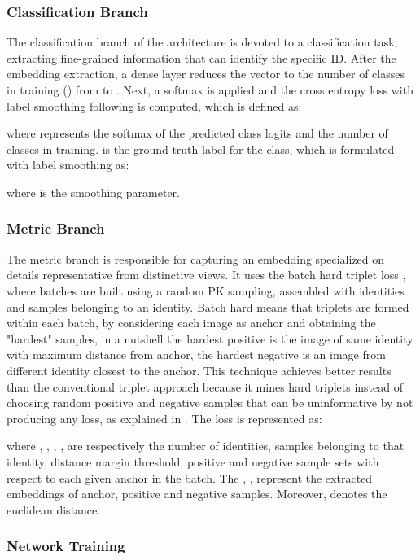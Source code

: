 \documentclass[letterpaper, 10pt, conference]{ieeeconf}
\begin{document}
\subsubsection{Classification Branch}
The classification branch of the architecture is devoted to a classification task, extracting fine-grained information that can identify the specific ID. After the embedding extraction, a dense layer reduces the vector to the number of classes in training () from  to . Next, a softmax is applied and the cross entropy loss with label smoothing following \cite{szegedy2016rethinking} is computed, which is defined as:

where  represents the softmax of the predicted class logits and  the number of classes in training.  is the ground-truth label for the  class, which is formulated with label smoothing as:

where  is the smoothing parameter.

\subsubsection{Metric Branch}
The metric branch is responsible for capturing an embedding specialized on details representative from distinctive views. It uses the batch hard triplet loss \cite{hermans2017defense}, where batches are built using a random PK sampling, assembled with  identities and  samples belonging to an identity. Batch hard means that triplets are formed within each batch, by considering each image as anchor and obtaining the "hardest" samples, in a nutshell the hardest positive is the image of same identity with maximum distance from anchor, the hardest negative is an image from different identity closest to the anchor. This technique achieves better results than the conventional triplet approach because it mines hard triplets instead of choosing random positive and negative samples that can be uninformative by not producing any loss, as explained in \cite{hermans2017defense}. The loss is represented as:

where , , , ,  are respectively the number of identities, samples belonging to that identity, distance margin threshold, positive and negative sample sets with respect to each given anchor in the batch. The , ,  represent the extracted embeddings of anchor, positive and negative samples. Moreover,  denotes the euclidean distance. 


\subsubsection{Network Training}
\end{document}
